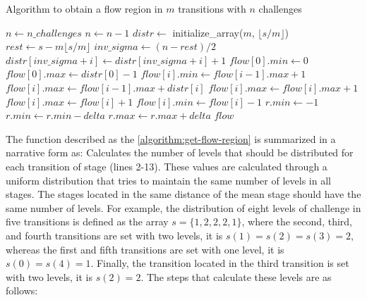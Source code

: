 \begin{algoritmo}
\caption{Algorithm to obtain a flow region in $m$ transitions with $n$ challenges}
\label{algorithm:get-flow-region}
\begin{algorithmic}[1]\small
{}
  \State $n \gets n\_challenges$%
    \State $n \gets n-1$
  \EndIf
  \State $distr \gets$ initialize\_array($m$, $\lfloor s/m \rfloor$)%
  \State $rest \gets s - m \lfloor s/m \rfloor$
    \State $inv\_sigma \gets (n-rest)/2$
      \State $distr[inv\_sigma+i] \gets distr[inv\_sigma+i]+1$
    \EndFor
  \EndIf
  \State $flow[0].min \gets 0$%
  \State $flow[0].max \gets distr[0] - 1$
    \State $flow[i].min \gets flow[i-1].max + 1$
    \State $flow[i].max \gets flow[i-1].max + distr[i]$
        \State $flow[i].max \gets flow[i].max + 1$
      \EndIf
          \State $flow[i].max \gets flow[i] + 1$
        \EndIf
          \State $flow[i].min \gets flow[i] - 1$
        \EndIf
      \EndIf
  \EndIf
  \EndFor
      \State $r.min \gets -1$
    \Else
      \State $r.min \gets r.min - delta$
      \State $r.max \gets r.max + delta$
    \EndIf
  \EndFor
  \State \Return $flow$
\EndFunction
\end{algorithmic}
\end{algoritmo}

The function  described as the \autoref{algorithm:get-flow-region} is summarized in a narrative form as:
Calculates the number of levels that should be distributed for each transition of stage (lines 2-13). These values are calculated through a uniform distribution that tries to maintain the same number of levels in all stages. The stages located in the same distance of the mean stage should have the same number of levels. For example, the distribution of eight levels of challenge in five transitions is defined as the array $s = \{1,2,2,2,1\}$, where the second, third, and fourth transitions are set with two levels, it is $s(1) = s(2) = s(3) = 2$, whereas the first and fifth transitions are set with one level, it is $s(0) = s(4) = 1$. Finally, the transition located in the third transition is set with two levels, it is $s(2) = 2$. The steps that calculate these levels are as follows:

